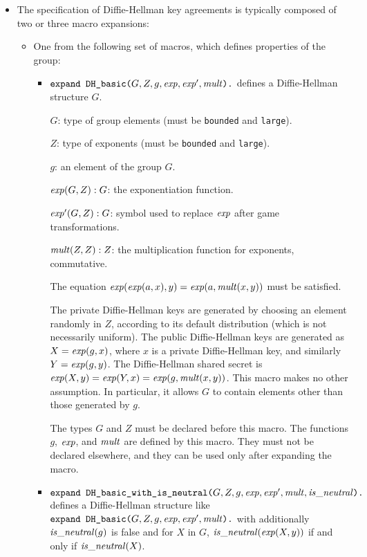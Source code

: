 \documentclass{article}
\begin{document}
\begin{itemize}
 \item The specification of Diffie-Hellman key agreements is typically composed of two or three macro expansions:

   \begin{itemize}
   \item One from the following set of macros, which defines properties of the group:
     \begin{itemize}
     \item $\texttt{expand\ DH\_basic(}G, Z, g, \mathit{exp}, \mathit{exp}', \mathit{mult}\texttt{).}$ defines a Diffie-Hellman structure $G$.

       $G$: type of group elements (must be \texttt{bounded} and \texttt{large}).

       $Z$: type of exponents (must be \texttt{bounded} and
       \texttt{large}). 
       
       $g$: an element of the group $G$.

       $\mathit{exp}(G, Z): G$: the exponentiation function.  
       
       $\mathit{exp}'(G, Z): G$: symbol used to replace $\mathit{exp}$ after game transformations.

       $\mathit{mult}(Z, Z): Z$: the multiplication function for exponents, commutative.

       The equation $\mathit{exp}(\mathit{exp}(a,x), y) = \mathit{exp}(a,
       \mathit{mult}(x,y))$ must be satisfied.

       The private Diffie-Hellman keys are generated by choosing an
       element randomly in $Z$, according to its default distribution
       (which is not necessarily uniform). The public Diffie-Hellman
       keys are generated as $X = \mathit{exp}(g,x)$, where $x$ is a
       private Diffie-Hellman key, and similarly $Y =
       \mathit{exp}(g,y)$. The Diffie-Hellman shared secret is
       $\mathit{exp}(X,y) = \mathit{exp}(Y,x) = \mathit{exp}(g,\mathit{mult}(x,y))$.
       This macro makes no other assumption. In particular, it allows
       $G$ to contain elements other than those generated by $g$.

       The types $G$ and $Z$ must be declared before this macro.  The
       functions $g$, $\mathit{exp}$, and $\mathit{mult}$ are defined by this
       macro. They must not be declared elsewhere, and they can be used
       only after expanding the macro.

     \item $\texttt{expand\ DH\_basic\_with\_is\_neutral(}G, Z, g, \vn{exp}, \vn{exp}', \vn{mult}, \vn{is\_neutral}\texttt{).}$ defines a Diffie-Hellman structure like $\texttt{expand\ DH\_basic(}G, Z, g, \mathit{exp}, \mathit{exp}', \mathit{mult}\texttt{).}$ with additionally $\mathit{is\_neutral}(g)$ is false and for $X$ in $G$, $\mathit{is\_neutral}(\mathit{exp}(X,y))$ if and only if $\mathit{is\_neutral}(X)$.


\end{itemize}
\end{itemize}
\end{itemize}
\end{document}

